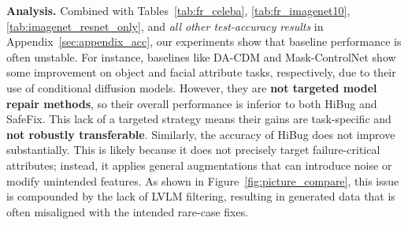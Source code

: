 \documentclass[10pt]{article} %
\newcommand{\model}{SafeFix\xspace}
\newcommand{\hibug}{HiBug\xspace}
\begin{document}
\begin{table}
\centering
\small
\setlength{\tabcolsep}{4pt}
\renewcommand{\arraystretch}{0.95}
\caption{Test accuracy (\%) on ImageNet10 using ResNet-18.}
\label{tab:imagenet_resnet_only}

\vspace{-10pt}
\end{table}




\noindent\textbf{Analysis.}
Combined with Tables~\ref{tab:fr_celeba}, \ref{tab:fr_imagenet10}, \ref{tab:imagenet_resnet_only}, and \emph{all other test-accuracy results} in Appendix~\ref{sec:appendix_acc}, our experiments show that baseline performance is often unstable. For instance, baselines like DA-CDM and Mask-ControlNet show some improvement on object and facial attribute tasks, respectively, due to their use of conditional diffusion models. However, they are \textbf{not targeted model repair methods}, so their overall performance is inferior to both HiBug and \model. This lack of a targeted strategy means their gains are task-specific and \textbf{not robustly transferable}.
Similarly, the accuracy of \hibug{} does not improve substantially. This is likely because it does not precisely target failure-critical attributes; instead, it applies general augmentations that can introduce noise or modify unintended features. As shown in Figure~\ref{fig:picture_compare}, this issue is compounded by the lack of LVLM filtering, resulting in generated data that is often misaligned with the intended rare-case fixes.
\end{document}
